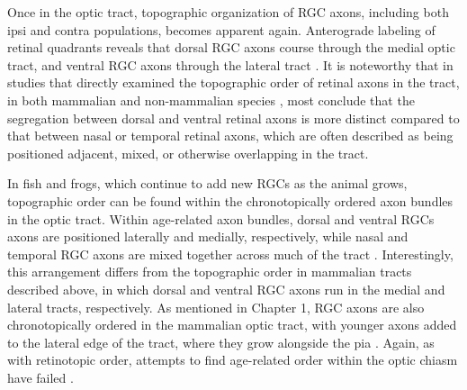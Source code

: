 Once in the optic tract, topographic organization of RGC axons, including both ipsi and contra populations, becomes apparent again.
Anterograde labeling of retinal quadrants reveals that dorsal RGC axons course through the medial optic tract, and ventral RGC axons through the lateral tract \cite{torrealba1982studies,reh1983organization,reese1990fibre,reese1993reestablishment,chan1994changes,chan1999changes,plas2005pretarget}.
It is noteworthy that in studies that directly examined the topographic order of retinal axons in the tract, in both mammalian \cite{reese1993reestablishment,chan1994changes,plas2005pretarget} and non-mammalian species \cite{reh1983organization,thanos1983investigations,ehrlich1984course,montgomery1998organization}, most conclude that the segregation between dorsal and ventral retinal axons is more distinct compared to that between nasal or temporal retinal axons, which are often described as being positioned adjacent, mixed, or otherwise overlapping in the tract.

In fish and frogs, which continue to add new RGCs as the animal grows, topographic order can be found within the chronotopically ordered axon bundles in the optic tract.
Within age-related axon bundles, dorsal and ventral RGCs axons are positioned laterally and medially, respectively, while nasal and temporal RGC axons are mixed together across much of the tract \cite{reh1983organization}.
Interestingly, this arrangement differs from the topographic order in mammalian tracts described above, in which dorsal and ventral RGC axons run in the medial and lateral tracts, respectively.
As mentioned in Chapter 1, RGC axons are also chronotopically ordered in the mammalian optic tract, with younger axons added to the lateral edge of the tract, where they grow alongside the pia \cite{walsh1985age,reese1987distributionrat,reese1990fibre,colello1992observations,reese1997chronotopic}.
Again, as with retinotopic order, attempts to find age-related order within the optic chiasm have failed \cite{colello1998changing}.